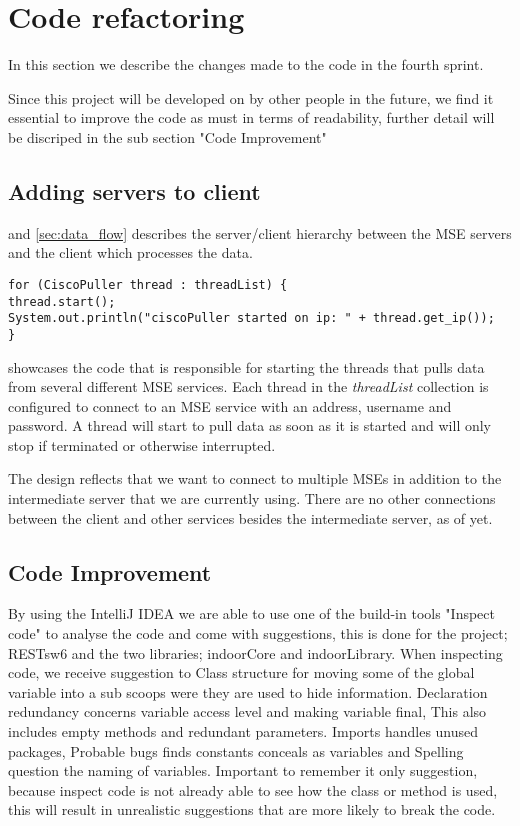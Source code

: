 \section{Code refactoring}
In this section we describe the changes made to the code in the fourth sprint.

Since this project will be developed on by other people in the future, we find it essential to improve the code as must in terms of readability, further detail will be discriped in the sub section "Code Improvement"

\subsection*{Adding servers to client}
 and \cref{sec:data_flow} describes the server/client hierarchy between the MSE servers and the client which processes the data. 
\begin{lstlisting}[caption={Starting multiple threads to pull data from multiple MSE servers}, label={lst:cisco_puller}, language=inc_Java]
for (CiscoPuller thread : threadList) {
thread.start();
System.out.println("ciscoPuller started on ip: " + thread.get_ip());
}
\end{lstlisting}
 showcases the code that is responsible for starting the threads that pulls data from several different MSE services. Each thread in the \textit{threadList} collection is configured to connect to an MSE service with an address, username and password. A thread will start to pull data as soon as it is started and will only stop if terminated or otherwise interrupted.

The design reflects that we want to connect to multiple MSEs in addition to the intermediate server that we are currently using. There are no other connections between the client and other services besides the intermediate server, as of yet.

\subsection*{Code Improvement}
By using the IntelliJ IDEA we are able to use one of the build-in tools "Inspect code" to analyse the code and come with suggestions, this is done for the project; RESTsw6 and the two libraries; indoorCore and indoorLibrary. When inspecting code, we receive suggestion to Class structure for moving some of the global variable into a sub scoops were they are used to hide information. Declaration redundancy concerns variable access level and making variable final, This also includes empty methods and redundant parameters. Imports handles unused packages, Probable bugs finds constants conceals as variables and Spelling question the naming of variables. Important to remember it only suggestion, because inspect code is not already able to see how the class or method is used, this will result in unrealistic suggestions that are more likely to break the code.


